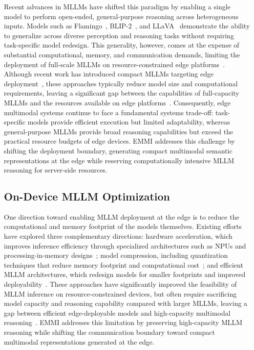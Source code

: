 \documentclass[10pt,twocolumn]{article}
\begin{document}
Recent advances in MLLMs have shifted this paradigm by enabling a
single model to perform open-ended, general-purpose reasoning across
heterogeneous inputs. Models such as Flamingo~\cite{alayrac2022flamingo},
BLIP-2~\cite{li2023blip2}, and LLaVA~\cite{liu2023llava} demonstrate
the ability to generalize across diverse perception and reasoning tasks
without requiring task-specific model redesign. This generality, however,
comes at the expense of substantial computational, memory, and communication
demands, limiting the deployment of full-scale MLLMs on resource-constrained
edge platforms~\cite{edgellm1,edgellm2}. Although recent work has introduced
compact MLLMs targeting edge deployment~\cite{edgellm1,tinyml1}, these
approaches typically reduce model size and computational requirements,
leaving a significant gap between the capabilities of full-capacity MLLMs
and the resources available on edge platforms~\cite{tinyml1,survey1,survey2}.
Consequently, edge multimodal systems continue to face a fundamental
systems trade-off: task-specific models provide efficient execution but
limited adaptability, whereas general-purpose MLLMs provide broad reasoning
capabilities but exceed the practical resource budgets of edge devices.
EMMI addresses this challenge by shifting the deployment boundary,
generating compact multimodal semantic representations at the edge while
reserving computationally intensive MLLM reasoning for server-side resources.

\subsection{On-Device MLLM Optimization}

One direction toward enabling MLLM deployment at the edge is to reduce
the computational and memory footprint of the models themselves. Existing
efforts have explored three complementary directions: hardware acceleration,
which improves inference efficiency through specialized architectures such
as NPUs and processing-in-memory designs~\cite{p3llm,motoyama2024iedm};
model compression, including quantization techniques that reduce memory
footprint and computational cost~\cite{lin2024awq}; and efficient MLLM
architectures, which redesign models for smaller footprints and improved
deployability~\cite{yao2024gkt,yao2025efficient,compact1}. These approaches
have significantly improved the feasibility of MLLM inference on
resource-constrained devices, but often require sacrificing model capacity
and reasoning capability compared with larger MLLMs, leaving a gap between
efficient edge-deployable models and high-capacity multimodal
reasoning~\cite{edgellm1,edgellm2}. EMMI addresses this limitation by
preserving high-capacity MLLM reasoning while shifting the communication
boundary toward compact multimodal representations generated at the edge.
\end{document}
